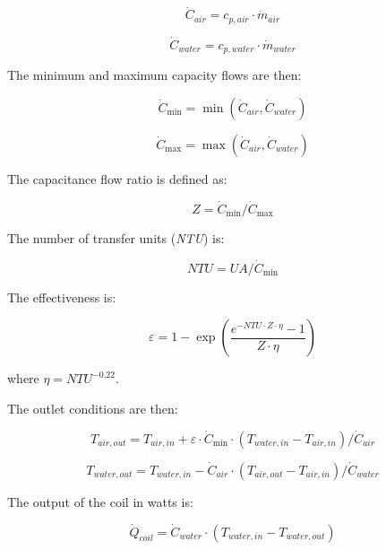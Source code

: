 \begin{equation}
{\dot C_{air}} = {c_{p,air}}\cdot {\dot m_{air}}
\end{equation}

\begin{equation}
{\dot C_{water}} = {c_{p,water}}\cdot {\dot m_{water}}
\end{equation}

The minimum and maximum capacity flows are then:

\begin{equation}
{\dot C_{\min }} = \min ({\dot C_{air}},{\dot C_{water}})
\end{equation}

\begin{equation}
{\dot C_{\max }} = \max ({\dot C_{air}},{\dot C_{water}})
\end{equation}

The capacitance flow ratio is defined as:

\begin{equation}
Z = {\dot C_{\min }}/{\dot C_{\max }}
\end{equation}

The number of transfer units (\emph{NTU}) is:

\begin{equation}
NTU = UA/{\dot C_{\min }}
\end{equation}

The effectiveness is:

\begin{equation}
\varepsilon  = 1 - \exp (\frac{{{e^{ - NTU \cdot Z \cdot \eta }} - 1}}{{Z \cdot \eta }})
\end{equation}

where \(\eta = NT{U^{ - 0.22}}\).

The outlet conditions are then:

\begin{equation}
{T_{air,out}} = {T_{air,in}} + \varepsilon \cdot {\dot C_{\min }}\cdot ({T_{water,in}} - {T_{air,in}})/{\dot C_{air}}
\end{equation}

\begin{equation}
{T_{water,out}} = {T_{water,in}} - {\dot C_{air}}\cdot ({T_{air,out}} - {T_{air,in}})/{\dot C_{water}}
\end{equation}

The output of the coil in watts is:

\begin{equation}
{\dot Q_{coil}} = {\dot C_{water}}\cdot ({T_{water,in}} - {T_{water,out}})
\end{equation}

